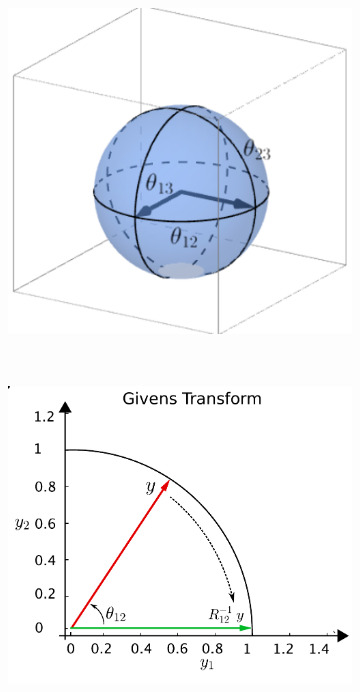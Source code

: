 \documentclass{article}
\begin{document}
\begin{figure}
    \centering
    \begin{subfigure}[b]{0.3\textwidth}
        \includegraphics[width=\textwidth]{StiefelGeom.pdf}
        \caption{}
        \label{fig:StiefelGeom}
    \end{subfigure}
    ~ %
    \begin{subfigure}[b]{0.3\textwidth}
        \includegraphics[width=\textwidth]{GivensReduction_atz.pdf}

\end{subfigure}
\end{figure}
\end{document}
